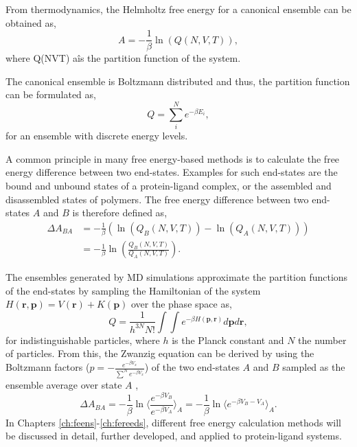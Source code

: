 From thermodynamics, the Helmholtz free energy\cite{Helmholtz1882} for a canonical ensemble can be obtained as, 
\begin{equation}
    A =  -\frac{1}{\beta} \ln(Q(N, V, T)),
\end{equation}
where Q(NVT) aîs the partition function of the system. \cite{Atkins2014}

The canonical ensemble is Boltzmann distributed \cite{Boltzmann1872} and thus, the partition function can be formulated as,
\begin{equation}
    Q =\sum^N_i e^{-\beta E_i} ,
\end{equation} 
for an ensemble with discrete energy levels.  \cite{Atkins2014}

A common principle in many free energy-based methods is to calculate the free energy difference between two end-states. \cite{Ytreberg2006, Kirkwood1935, Zwanzig1954} Examples for such end-states are the bound and unbound states of a protein-ligand complex, or the assembled and disassembled states of polymers. \cite{Kollman1993, Armacost2020, Christ2009, Hansen2014, Cournia2020} 
%
The free energy difference between two end-states $A$ and $B$ is therefore defined as,  \cite{Atkins2014}
\begin{equation}
    \begin{split}
        \Delta A_{BA} &= -\frac{1}{\beta} (\ln( Q_B(N, V, T) ) - \ln(Q_A(N, V, T)))\\
        &= -\frac{1}{\beta} \ln(\frac{Q_B(N, V, T)}{Q_A(N, V, T)}).
    \end{split}
\end{equation}

The ensembles generated by MD simulations approximate the partition functions of the end-states by sampling the Hamiltonian of the system $H(\textbf{r},\textbf{p})=V(\textbf{r})+K(\textbf{p})$ over the phase space as,\cite{Allen2017} 
\begin{equation}
    Q = \frac{1}{h^{3N} N!}  \int \int e^{-\beta H(\textbf{p},\textbf{r})} d \textbf{p} d \textbf{r} ,
\end{equation}
for indistinguishable particles, where $h$ is the Planck constant and $N$ the number of particles.
%
From this, the Zwanzig equation\cite{Zwanzig1954} can be derived by using the Boltzmann factors ($p=-\frac{e^{-\beta V_x}}{\sum^N e^{-\beta V_x}}$) of the two end-states $A$ and $B$ sampled as the ensemble average over state $A$ \cite{Zwanzig1954}, 
\begin{equation}
        \Delta A_{BA} 
        = -\frac{1}{\beta} \ln\langle \frac{e^{-\beta V_B}}{e^{-\beta V_A}}\rangle_A
        = -\frac{1}{\beta} \ln\langle e^{-\beta V_B-V_A}\rangle_A .
\end{equation}
In Chapters \ref{ch:feens}-\ref{ch:fereeds}, different free energy calculation methods will be discussed in detail, further developed, and applied to protein-ligand systems. 